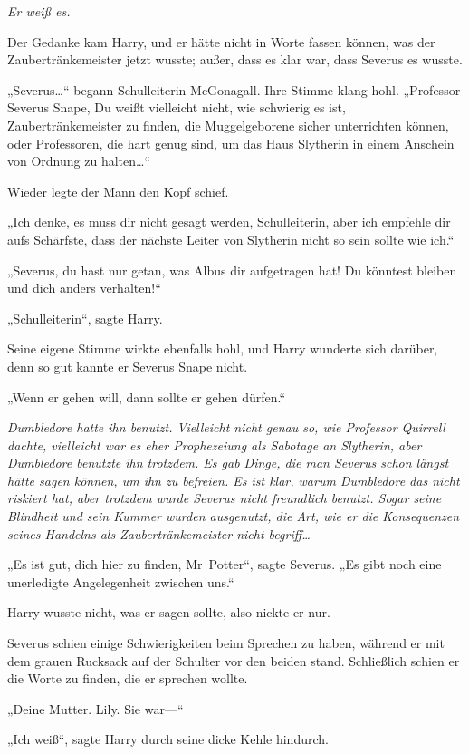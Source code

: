 {\emph{Er weiß es.}

Der Gedanke kam Harry, und er hätte nicht in Worte fassen können, was der Zaubertränkemeister jetzt wusste; außer, dass es klar war, dass Severus es wusste.

„Severus…“ begann Schulleiterin McGonagall. Ihre Stimme klang hohl. „Professor Severus Snape, Du weißt vielleicht nicht, wie schwierig es ist, Zaubertränkemeister zu finden, die Muggelgeborene sicher unterrichten können, oder Professoren, die hart genug sind, um das Haus Slytherin in einem Anschein von Ordnung zu halten…“

Wieder legte der Mann den Kopf schief.

„Ich denke, es muss dir nicht gesagt werden, Schulleiterin, aber ich empfehle dir aufs Schärfste, dass der nächste Leiter von Slytherin nicht so sein sollte wie ich.“

„Severus, du hast nur getan, was Albus dir aufgetragen hat! Du könntest bleiben und dich anders verhalten!“

„Schulleiterin“, sagte Harry.

Seine eigene Stimme wirkte ebenfalls hohl, und Harry wunderte sich darüber, denn so gut kannte er Severus Snape nicht.

„Wenn er gehen will, dann sollte er gehen dürfen.“

\emph{Dumbledore hatte ihn benutzt. Vielleicht nicht genau so, wie Professor Quirrell dachte, vielleicht war es eher Prophezeiung als Sabotage an Slytherin, aber Dumbledore benutzte ihn trotzdem. Es gab Dinge, die man Severus schon längst hätte sagen können, um ihn zu befreien. Es ist klar, warum Dumbledore das nicht riskiert hat, aber trotzdem wurde Severus nicht freundlich benutzt. Sogar seine Blindheit und sein Kummer wurden ausgenutzt, die Art, wie er die Konsequenzen seines Handelns als Zaubertränkemeister nicht begriff…}

„Es ist gut, dich hier zu finden, Mr~Potter“, sagte Severus. „Es gibt noch eine unerledigte Angelegenheit zwischen uns.“

Harry wusste nicht, was er sagen sollte, also nickte er nur.

Severus schien einige Schwierigkeiten beim Sprechen zu haben, während er mit dem grauen Rucksack auf der Schulter vor den beiden stand. Schließlich schien er die Worte zu finden, die er sprechen wollte.

„Deine Mutter. Lily. Sie war—“

„Ich weiß“, sagte Harry durch seine dicke Kehle hindurch.

}

